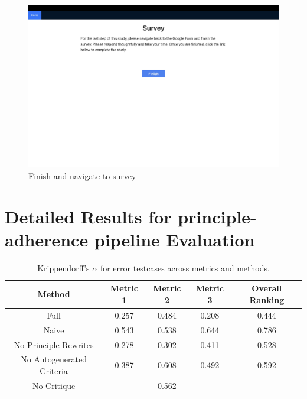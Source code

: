 \documentclass[11pt]{article}
\begin{document}
\begin{figure}[ht]
    \centering
    \includegraphics[width=\textwidth]{Study Screenshots/Screen14.jpeg}
    \caption{Finish and navigate to survey}
    \label{fig:screen14}
\end{figure}

\section{Detailed Results for principle-adherence pipeline Evaluation}
\label{sec:detres}

\begin{table}[h!]
\small
\centering
\begin{tabular}{|c|c|c|c|c|}
\hline
Method                    & Metric 1 & Metric 2 & Metric 3 & Overall Ranking \\ \hline
Full                      & 0.257  & 0.484    & 0.208       & 0.444           \\ \hline
Naive                     & 0.543   & 0.538    & 0.644       & 0.786           \\ \hline
No Principle Rewrites     & 0.278   & 0.302    & 0.411       & 0.528           \\ \hline
No Autogenerated Criteria & 0.387   & 0.608    & 0.492       & 0.592           \\ \hline
No Critique & -   & 0.562    & -       & -           \\ \hline
\end{tabular}
\caption{Krippendorff's $\alpha$ for error testcases across metrics and methods.}
\label{tab:alpha2}
\end{table}
\end{document}
